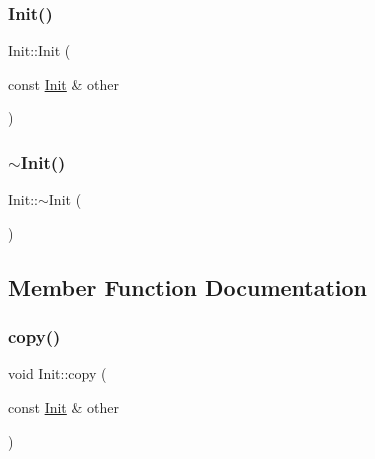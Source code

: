 \mbox{\label{class_init_a9d26400c5fabf20571808ad773524669}} 
\subsubsection{\texorpdfstring{Init()}{Init()}\hspace{0.1cm}{\footnotesize\ttfamily [2/2]}}
{\footnotesize\ttfamily Init\+::\+Init (\begin{DoxyParamCaption}\item[{const \hyperlink{class_init}{Init} \&}]{other }\end{DoxyParamCaption})}

\mbox{\label{class_init_a67d5c94cb965fa3b774e969cfb4969d1}} 
\subsubsection{\texorpdfstring{$\sim$\+Init()}{~Init()}}
{\footnotesize\ttfamily Init\+::$\sim$\+Init (\begin{DoxyParamCaption}{ }\end{DoxyParamCaption})\hspace{0.3cm}{\ttfamily [virtual]}}



\subsection{Member Function Documentation}
\mbox{\label{class_init_a045745f591e312608e5ee3639f4459ba}} 
\subsubsection{\texorpdfstring{copy()}{copy()}}
{\footnotesize\ttfamily void Init\+::copy (\begin{DoxyParamCaption}\item[{const \hyperlink{class_init}{Init} \&}]{other }\end{DoxyParamCaption})\hspace{0.3cm}{\ttfamily [private]}}

\mbox{\label{class_init_ad1e6c6b247eae6eaac5dd8e9dc9cdce0}} 
